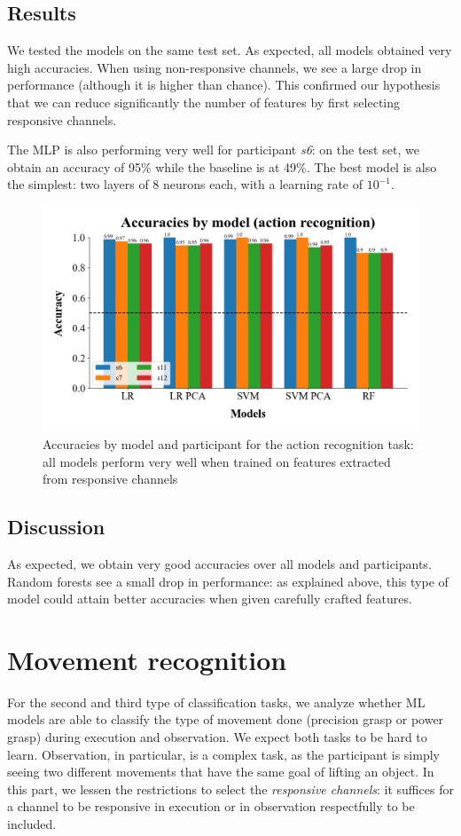 \documentclass[10pt,conference,compsocconf]{IEEEtran}
\begin{document}
\subsection{Results}
We tested the models on the same test set. As expected, all models obtained very high accuracies. When using non-responsive channels, we see a large drop in performance (although it is higher than chance). This confirmed our hypothesis that we can reduce significantly the number of features by first selecting responsive channels.

The MLP is also performing very well for participant \textit{s6}: on the test set, we obtain an accuracy of 95\% while the baseline is at 49\%. The best model is also the simplest: two layers of 8 neurons each, with a learning rate of \(10^{-1}\).

\begin{figure}[h!]
  \center
  \includegraphics[width=\linewidth]{../Code/figures/accuracies_across_part_ExObs.png}
  \caption{Accuracies by model and participant for the action recognition task: all models perform very well when trained on features extracted from responsive channels}
\end{figure}
\FloatBarrier

\subsection{Discussion}
As expected, we obtain very good accuracies over all models and participants. Random forests see a small drop in performance: as explained above, this type of model could attain better accuracies when given carefully crafted features.

\section{Movement recognition}
\label{sec:objectrecognition}
For the second and third type of classification tasks, we analyze whether ML models are able to classify the type of movement done (precision grasp or power grasp) during execution and observation. We expect both tasks to be hard to learn. Observation, in particular, is a complex task, as the participant is simply seeing two different movements that have the same goal of lifting an object. In this part, we lessen the restrictions to select the \textit{responsive channels}: it suffices for a channel to be responsive in execution or in observation respectfully to be included.
\end{document}

